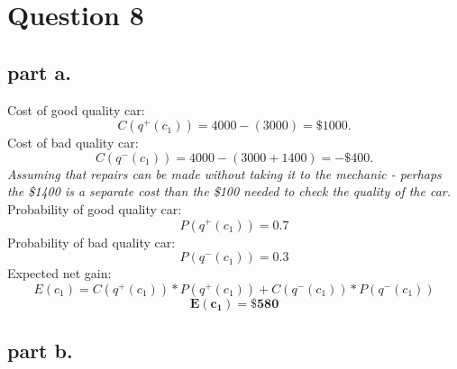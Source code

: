\section{Question 8}

\subsection{part a.}
Cost of good quality car:
\begin{equation}
\label{eq:c+}
C(q^+(c_1)) = 4000 - (3000) = \$1000.
\end{equation}
Cost of bad quality car:
\begin{equation}
\label{eq:c-}
C(q^-(c_1)) = 4000 - (3000 + 1400) = -\$400. 
\end{equation}
\textit{Assuming that repairs can be made without taking it to the mechanic - perhaps the \$1400 is a separate cost than the \$100 needed to check the quality of the car.} \\
Probability of good quality car:
\begin{equation}
\label{eq:+}
	P(q^+(c_1)) = 0.7
\end{equation}
Probability of bad quality car:
\begin{equation}
\label{eq:-}
	P(q^-(c_1)) = 0.3
\end{equation}
Expected net gain:
\[E(c_1) = C(q^+(c_1))*P(q^+(c_1)) + C(q^-(c_1))*P(q^-(c_1))\]
\begin{equation} 
\label{eq:expected_value} 
\mathbf{E(c_1) = \$580} 
\end{equation}


\subsection{part b.}

